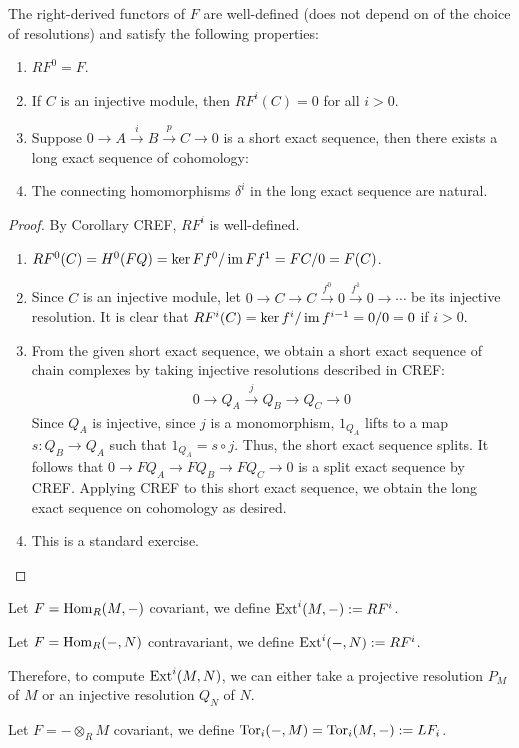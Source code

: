 \documentclass[12pt,class=article,crop=false]{standalone}
\begin{document}
\begin{prop}
The right-derived functors of $ F$ are well-defined (does not depend on of the choice of resolutions) and satisfy the following properties:
\begin{enumerate}[label=(\arabic*)]
	\item $ RF^{0} = F$.
	\item If $ C$ is an injective module, then  $ RF^i(C) = 0$ for all $ i>0$.
	\item Suppose $ 0 \to A \xrightarrow{ i} B \xrightarrow{ p} C \to 0 $ is a short exact sequence, then there exists a long exact sequence of cohomology:
	\item The connecting homomorphisms  $ \delta^i$ in the long exact sequence are natural.
\end{enumerate}
\end{prop}
\begin{proof}
By Corollary CREF, $ RF^{i}$ is well-defined.
\begin{enumerate}[label=(\arabic*)]
	\item $ RF^{0}(C) = H^{0}(FQ) = \ker Ff^{0} / \operatorname{im} F f^{1} = FC / 0 = F(C)$.
	\item Since $ C$ is an injective module, let  $ 0 \to C \to C \xrightarrow{ f^{0}}  0 \xrightarrow{ f^{1}}  0 \to \cdots $ be its injective resolution. It is clear that $ RF^{i}(C) = \ker f^{i} / \operatorname{im} f^{i-1} = 0 / 0 = 0$ if $ i>0$.
	\item From the given short exact sequence, we obtain a short exact sequence of chain complexes by taking injective resolutions described in CREF:
		\begin{align*}
			0 \to Q_A \xrightarrow{ j}  Q_B \to Q_C \to 0
		\end{align*}
Since $ Q_A$ is injective, since $ j$ is a monomorphism, $ 1_{Q_A}$ lifts to a map $ s: Q_B \to Q_A$ such that $ 1_{Q_A} = s \circ j$. Thus, the short exact sequence splits. It follows that  $ 0 \to  FQ_A \to FQ_B \to FQ_C \to 0$ is a split exact sequence by CREF. Applying CREF to this short exact sequence, we obtain the long exact sequence on cohomology as desired.

\item This is a standard exercise.

\end{enumerate}
\end{proof}

Let $ F = \operatorname{Hom}_R( M,-)$ covariant, we define $ \operatorname{Ext}^{i}(M,-) := RF^{i}$.

Let $ F = \operatorname{Hom}_R( -, N)$ contravariant, we define $ \operatorname{Ext}^{i}(-,N) := RF^{i}$.

Therefore, to compute $ \operatorname{Ext}^{i}(M,N)$, we can either take a projective resolution $ P_M$ of  $ M$ or an injective resolution  $ Q_N$ of  $ N$.

Let $ F = - \otimes_R M$ covariant, we define $ \operatorname{Tor}_{i}(-,M) = \operatorname{Tor}_i(M,-) := LF_i$.
\end{document}
